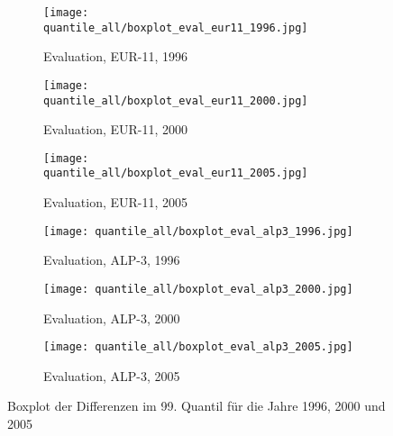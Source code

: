 \begin{figure}
	\begin{subfigure}{0.32\textwidth}
		\texttt{[image: quantile\_all/boxplot\_eval\_eur11\_1996.jpg]}
		\caption{Evaluation, EUR-11, 1996}
	\end{subfigure}
	\begin{subfigure}{0.32\textwidth}
		\texttt{[image: quantile\_all/boxplot\_eval\_eur11\_2000.jpg]}
		\caption{Evaluation, EUR-11, 2000}
	\end{subfigure}
	\begin{subfigure}{0.32\textwidth}
		\texttt{[image: quantile\_all/boxplot\_eval\_eur11\_2005.jpg]}
		\caption{Evaluation, EUR-11, 2005}
	\end{subfigure}
	\begin{subfigure}{0.32\textwidth}
		\texttt{[image: quantile\_all/boxplot\_eval\_alp3\_1996.jpg]}
		\caption{Evaluation, ALP-3, 1996}
	\end{subfigure}
	\begin{subfigure}{0.32\textwidth}
		\texttt{[image: quantile\_all/boxplot\_eval\_alp3\_2000.jpg]}
		\caption{Evaluation, ALP-3, 2000}
	\end{subfigure}
	\begin{subfigure}{0.32\textwidth}
		\texttt{[image: quantile\_all/boxplot\_eval\_alp3\_2005.jpg]}
		\caption{Evaluation, ALP-3, 2005}
	\end{subfigure}
	\caption{Boxplot der Differenzen im 99. Quantil für die Jahre 1996, 2000 und 2005}
	\label{fig:quantile_all_boxplot_all_years_2}
\end{figure}


